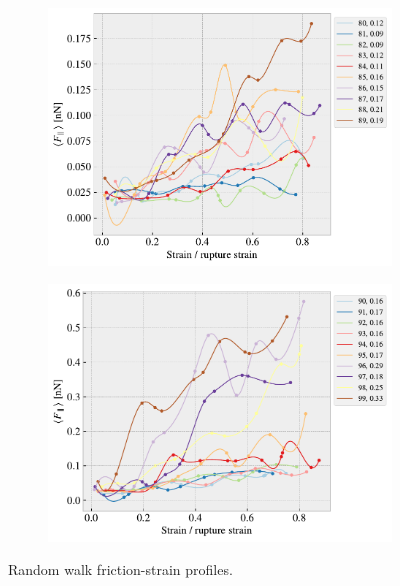 \begin{figure}[H]
\begin{subfigure}[b]{0.49\textwidth}
        \centering
        \includegraphics[width=\textwidth]{figures/stretch_profiles/RW/SP_8_RW.pdf}
        \caption{}
    \end{subfigure}
    \hfill
    \begin{subfigure}[b]{0.49\textwidth}
        \centering
        \includegraphics[width=\textwidth]{figures/stretch_profiles/RW/SP_9_RW.pdf}
        \caption{}
    \end{subfigure}
    \hfill
    \caption{Random walk friction-strain profiles.}
    \label{fig:fric_strain_RW}
\end{figure}
